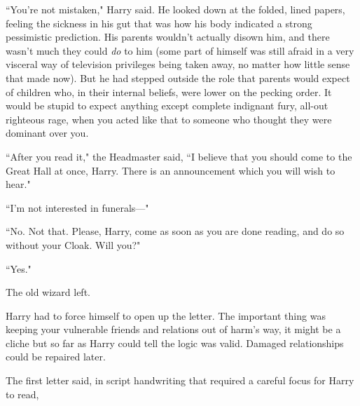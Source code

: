 ``You're not mistaken," Harry said. He looked down at the folded, lined papers, feeling the sickness in his gut that was how his body indicated a strong pessimistic prediction. His parents wouldn't actually disown him, and there wasn't much they could \emph{do} to him (some part of himself was still afraid in a very visceral way of television privileges being taken away, no matter how little sense that made now). But he had stepped outside the role that parents would expect of children who, in their internal beliefs, were lower on the pecking order. It would be stupid to expect anything except complete indignant fury, all-out righteous rage, when you acted like that to someone who thought they were dominant over you.

``After you read it," the Headmaster said, ``I believe that you should come to the Great Hall at once, Harry. There is an announcement which you will wish to hear."

``I'm not interested in funerals—"

``No. Not that. Please, Harry, come as soon as you are done reading, and do so without your Cloak. Will you?"

``Yes."

The old wizard left.

Harry had to force himself to open up the letter. The important thing was keeping your vulnerable friends and relations out of harm's way, it might be a cliche but so far as Harry could tell the logic was valid. Damaged relationships could be repaired later.

The first letter said, in script handwriting that required a careful focus for Harry to read,

